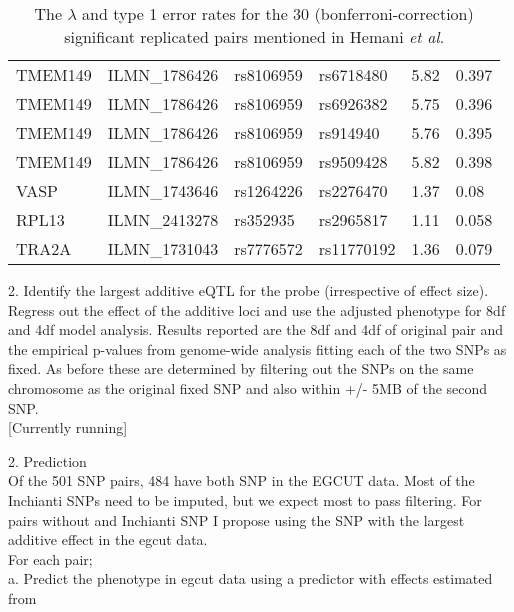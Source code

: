\documentclass[paper=a4, fontsize=11pt]{scrartcl}					%
\numberwithin{equation}{section}									%
\numberwithin{figure}{section}										%
\numberwithin{table}{section}										%
\begin{document}
\begin{table}[ht]
\begin{tabular}{llllll}
TMEM149 & ILMN\_1786426 & rs8106959 & rs6718480 & 5.82 & 0.397 \\ 
TMEM149 & ILMN\_1786426 & rs8106959 & rs6926382 & 5.75 & 0.396 \\ 
TMEM149 & ILMN\_1786426 & rs8106959 & rs914940 & 5.76 & 0.395 \\ 
TMEM149 & ILMN\_1786426 & rs8106959 & rs9509428 & 5.82 & 0.398 \\ 
VASP & ILMN\_1743646 & rs1264226 & rs2276470 & 1.37 & 0.08 \\ 
RPL13 & ILMN\_2413278 & rs352935 & rs2965817 & 1.11 & 0.058 \\ 
TRA2A & ILMN\_1731043 & rs7776572 & rs11770192 & 1.36 & 0.079 \\ 
   \hline
\end{tabular}
\caption*{The $\lambda$ and type 1 error rates for the 30 (bonferroni-correction) significant replicated pairs mentioned in Hemani \emph{et al}.}
\end{table}

\newpage

2. Identify the largest additive eQTL for the probe (irrespective of effect size). Regress out the effect of the additive loci and use the adjusted phenotype for 8df and 4df model analysis. Results reported are the 8df and 4df of original pair and the empirical p-values from genome-wide analysis fitting each of the two SNPs as fixed. As before these are determined by filtering out the SNPs on the same chromosome as the original fixed SNP and also within +/- 5MB of the second SNP. \\

[Currently running]

\vspace{1cm}

2. Prediction \\

Of the 501 SNP pairs, 484 have both SNP in the EGCUT data. Most of the Inchianti SNPs need to be imputed, but we expect most to pass filtering. For pairs without and Inchianti SNP I propose using the SNP with the largest additive effect in the egcut data. \\

For each pair; \\

a. Predict the phenotype in egcut data using a predictor with effects estimated from \\
\end{document}
